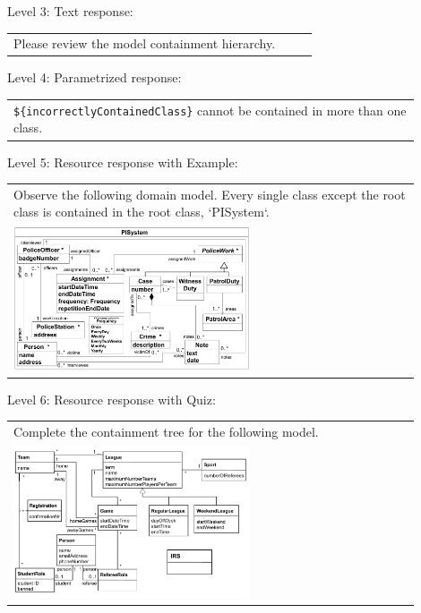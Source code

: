 \noindent Level 3: Text response: \medskip

\begin{tabular}{|p{0.9\linewidth}}
Please review the model containment hierarchy.
\end{tabular} \medskip

\noindent Level 4: Parametrized response: \medskip

\begin{tabular}{|p{0.9\linewidth}}
\verb|${incorrectlyContainedClass}| cannot be contained in more than one class.
\end{tabular} \medskip

\noindent Level 5: Resource response with Example: \medskip

\begin{tabular}{|p{0.9\linewidth}}
Observe the following domain model. Every single class except the root class is contained in the 
root class, `PISystem`.

\\
\includegraphics[width=0.6\textwidth]{images/PISystem.png}
\end{tabular} \medskip

\noindent Level 6: Resource response with Quiz: \medskip

\begin{tabular}{|p{0.9\linewidth}}
Complete the containment tree for the following model.

\\
\includegraphics[width=0.6\textwidth]{images/IRS.png}
\end{tabular} \medskip

